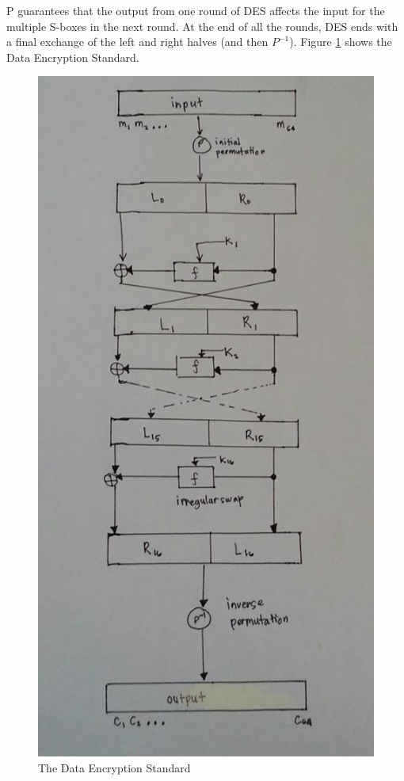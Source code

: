 \documentclass{article}
\begin{document}
P guarantees that the output from one round of DES affects the input for the multiple S-boxes in the next round. At the end of all the rounds, DES ends with a final exchange of the left and right halves (and then $P^{-1}$).\cite{landau2000} Figure \ref{DataEncryptionStandard} shows the Data Encryption Standard.
\begin{figure}[h]
\begin{center}
\includegraphics[scale=.3]{DataEncryptionStandard2.jpg}
\caption{The Data Encryption Standard}
\label{DataEncryptionStandard}
\end{center}
\end{figure}
\end{document}
